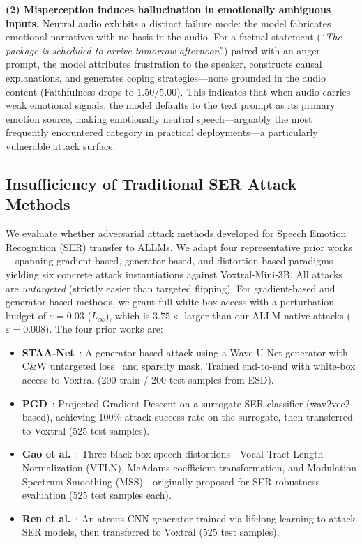 \textbf{(2) Misperception induces hallucination in emotionally ambiguous inputs.}
Neutral audio exhibits a distinct failure mode: the model fabricates emotional narratives with no basis in the audio. For a factual statement (``\textit{The package is scheduled to arrive tomorrow afternoon}'') paired with an anger prompt, the model attributes frustration to the speaker, constructs causal explanations, and generates coping strategies---none grounded in the audio content (Faithfulness drops to $1.50/5.00$). This indicates that when audio carries weak emotional signals, the model defaults to the text prompt as its primary emotion source, making emotionally neutral speech---arguably the most frequently encountered category in practical deployments---a particularly vulnerable attack surface.

\subsection{Insufficiency of Traditional SER Attack Methods}
\label{sec:obs_q3}

We evaluate whether adversarial attack methods developed for Speech Emotion Recognition (SER) transfer to ALLMs. We adapt four representative prior works---spanning gradient-based, generator-based, and distortion-based paradigms---yielding six concrete attack instantiations against Voxtral-Mini-3B. All attacks are \textit{untargeted} (strictly easier than targeted flipping). For gradient-based and generator-based methods, we grant full white-box access with a perturbation budget of $\varepsilon = 0.03$ ($L_\infty$), which is $3.75\times$ larger than our ALLM-native attacks ($\varepsilon = 0.008$). The four prior works are:

\begin{itemize}\setlength{\itemsep}{2pt}
    \item \textbf{STAA-Net}~\cite{staanet}: A generator-based attack using a Wave-U-Net generator with C\&W untargeted loss~\cite{cw} and sparsity mask. Trained end-to-end with white-box access to Voxtral (200 train / 200 test samples from ESD).
    \item \textbf{PGD}~\cite{pgd}: Projected Gradient Descent on a surrogate SER classifier (wav2vec2-based), achieving 100\% attack success rate on the surrogate, then transferred to Voxtral (525 test samples).
    \item \textbf{Gao et al.}~\cite{gao2022}: Three black-box speech distortions---Vocal Tract Length Normalization (VTLN), McAdams coefficient transformation, and Modulation Spectrum Smoothing (MSS)---originally proposed for SER robustness evaluation (525 test samples each).
    \item \textbf{Ren et al.}~\cite{ren2020}: An atrous CNN generator trained via lifelong learning to attack SER models, then transferred to Voxtral (525 test samples).
\end{itemize}


